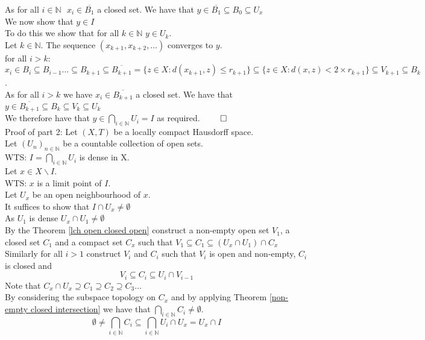 \documentclass{report}
\begin{document}
As for all $i \in \mathbb{N}\ \ \ x_i \in \overline{B_1}$ a closed set. We have that $y\in \overline{B_1}\subseteq B_0 \subseteq U_x$\\
We now show that $y\in I$\\
To do this we show that for all $k \in \mathbb{N}$  $y\in U_k$.\\
Let $k\in \mathbb{N}$. The sequence $(x_{k+1},x_{k+2}, \ldots)$ converges to $y$.\\
for all $i > k$:
$x_i\in B_i \subseteq B_{i-1} \ldots \subseteq B_{k+1}\subseteq \overline{B_{k+1}} = \{z \in X: d(x_{k+1},z) \leq {r_{k+1}}\} \subseteq \{z \in X: d(x,z) < 2\times r_{k+1}\} \subseteq V_{k+1} \subseteq B_k$.\\
As for all $i > k$ we have  $x_i \in \overline{B_{k+1}}$ a closed set. We have that $y\in \overline{B_{k+1}}\subseteq B_k \subseteq V_k \subseteq U_k$\\
We therefore have that $y\in \bigcap_{i\in\mathbb{N}}U_i = I$ as required. $\qed$\\
Proof of part 2: Let $(X,T)$ be a locally compact Hausdorff space.\\
Let $(U_n)_{n\in \mathbb{N}}$ be a countable collection of open sets.\\
WTS:  $I=\bigcap_{i\in \mathbb{N}}{U_i}$ is dense in X.\\
Let $x\in X\backslash I$.\\
WTS: $x$ is a limit point of $I$.\\
Let $U_x$ be an open neighbourhood of $x$.\\
It suffices to show that $I\cap U_x \neq \emptyset$\\
As $U_1$ is dense $U_x\cap U_1\neq \emptyset$\\
By the Theorem \ref{lch open closed open} construct a non-empty open set $V_1$, a closed set $C_1$ and a compact set $C_x$ such that $V_1 \subseteq C_1 \subseteq (U_x \cap U_1) \cap C_x$\\
Similarly for all $i>1$ construct $V_i$ and $C_i$ such that $V_i$ is open and non-empty, $C_i$ is closed and $$V_i\subseteq C_i \subseteq U_i \cap V_{i-1}$$
Note that $C_x\cap U_x \supseteq C_1\supseteq C_2 \supseteq C_3 \ldots$\\
By considering the subspace topology on $C_x$ and by applying Theorem \ref{non-empty closed intersection} we have that $\bigcap_{i\in \mathbb{N}} C_i \neq \emptyset$.\\
$$\emptyset \neq \bigcap_{i\in \mathbb{N}} C_i \subseteq \bigcap_{i\in \mathbb{N}} U_i\cap U_x = U_x\cap I$$
\end{document}
